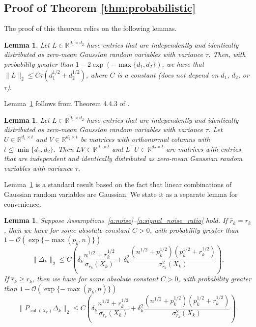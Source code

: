 \documentclass{amsart}
\DeclareMathOperator*{\col}{col}
\newtheorem{lemma}[theorem]{Lemma}
\begin{document}
\subsection{{Proof of Theorem \ref{thm:probabilistic}
}}
\label{proof:probabilistic}
{The proof of this theorem relies on the following lemmas.
\begin{lemma}Let $L \in \mathbb{R}^{d_1 \times d_2}$ have entries that are independently and identically distributed as zero-mean Gaussian random variables with variance $\tau$. Then, with probability greater than $1-2\exp(-\max\{d_1,d_2\})$, we have that $\|L\|_2 \leq C\tau(d_1^{1/2}+d_2^{1/2})$, where $C$ is a constant (does not depend on $d_1$, $d_2$, or $\tau$).
\label{lemma:gaussian_concentration}
\end{lemma}
Lemma~\ref{lemma:gaussian_concentration} follows from Theorem 4.4.3 of \cite{vershyninHighDimensionalProbabilityIntroduction2025}.
\begin{lemma} Let $L \in \mathbb{R}^{d_1 \times d_2}$ have entries that are independently and identically distributed as zero-mean Gaussian random variables with variance $\tau$. Let $U \in \mathbb{R}^{d_1 \times t}$ and $V \in \mathbb{R}^{d_2 \times t}$ be matrices with orthonormal columns with $t \leq \min\{d_1,d_2\}$. Then $LV \in \mathbb{R}^{d_1 \times t}$ and $L^\top{U} \in \mathbb{R}^{d_2 \times t}$ are matrices with entries that are independent and identically distributed as zero-mean Gaussian random variables with variance $\tau$. 
\label{lemma:linear_algebra}
\end{lemma}
Lemma~\ref{lemma:linear_algebra} is a standard result based on the fact that linear combinations of Gaussian random variables are Gaussian. We state it as a separate lemma for convenience.}

{
\begin{lemma}Suppose Assumptions~\ref{a:noise}--\ref{a:signal_noise_ratio} hold. If $\widehat r_k = r_k$, then
we have for some absolute constant $C>0$, with probability greater than $1-\mathcal{O}(\exp\{-\max(p_k,n)\})$
$$
\|\Delta_k\|_2 \leq C\left(\delta_k\frac{n^{1/2}+r_k^{1/2}}{\sigma_{r_k}(X_k)} + \delta_k^2\frac{(n^{1/2} + p_k^{1/2})(p_k^{1/2}+r_k^{1/2})}{\sigma_{r_k}^2(X_k)}\right).
$$
If $\widehat r_k \geq r_k$, then we have for some absolute constant $C>0$, with probability greater than $1-\mathcal{O}(\exp\{-\max(p_k,n)\})$
$$
\|P_{\col(X_k)}\Delta_k\|_2 \leq C\left(\delta_k\frac{n^{1/2}+r_k^{1/2}}{\sigma_{r_k}(X_k)} + \delta_k^2\frac{(n^{1/2} + p_k^{1/2})(p_k^{1/2}+r_k^{1/2})}{\sigma_{r_k}^2(X_k)}\right).
$$
\label{lemma:probab}
\end{lemma}}
\end{document}
